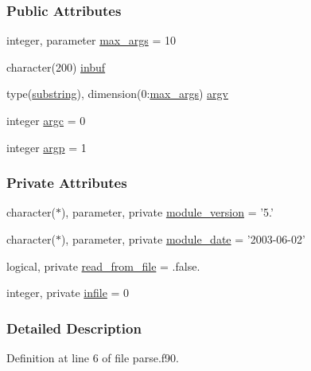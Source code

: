 \subsubsection*{Public Attributes}
\begin{DoxyCompactItemize}
\item 
integer, parameter \hyperlink{classparse_a8b0a79d83e5d7aae1e44e5f32f50618f}{max\-\_\-args} = 10
\item 
character(200) \hyperlink{classparse_a5ed9415ec38213bcae027d4e1b47e70d}{inbuf}
\item 
type(\hyperlink{structparse_1_1substring}{substring}), dimension(0\-:\hyperlink{classparse_a8b0a79d83e5d7aae1e44e5f32f50618f}{max\-\_\-args}) \hyperlink{classparse_a1efebe34a6731dd52a87135aaaa24f7a}{argv}
\item 
integer \hyperlink{classparse_a5bca195c9352dc7550bc449b7a076542}{argc} = 0
\item 
integer \hyperlink{classparse_af224a4f20e8b2bd2ee132df0d2e471f9}{argp} = 1
\end{DoxyCompactItemize}
\subsubsection*{Private Attributes}
\begin{DoxyCompactItemize}
\item 
character($\ast$), parameter, private \hyperlink{classparse_aa3d8a423d5bb7625e5a7ec62411e1d27}{module\-\_\-version} = '5.'
\item 
character($\ast$), parameter, private \hyperlink{classparse_a58e790a1b3fb15a5bf452bed72824bb5}{module\-\_\-date} = '2003-\/06-\/02'
\item 
logical, private \hyperlink{classparse_a05b49575e8cecd7362ce03a284f6ba95}{read\-\_\-from\-\_\-file} = .false.
\item 
integer, private \hyperlink{classparse_a41e02cf4a2db631678f15e65d28465fc}{infile} = 0
\end{DoxyCompactItemize}


\subsubsection{Detailed Description}


Definition at line 6 of file parse.\-f90.



